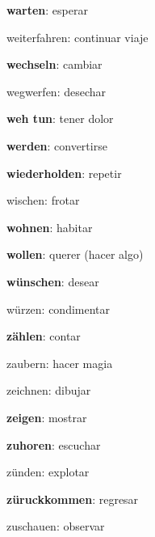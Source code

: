 \begin{multicols}{2}
\begin{myitemize}
\item \textbf{warten}: esperar
\item weiterfahren: continuar viaje
\item \textbf{wechseln}: cambiar
\item wegwerfen: desechar
\item \textbf{weh tun}: tener dolor
\item \textbf{werden}: convertirse
\item \textbf{wiederholden}: repetir
\item wischen: frotar
\item \textbf{wohnen}: habitar
\item \textbf{wollen}: querer (hacer algo)
\item \textbf{wünschen}: desear
\item würzen: condimentar
\item \textbf{zählen}: contar
\item zaubern: hacer magia
\item zeichnen: dibujar
\item \textbf{zeigen}: mostrar
\item \textbf{zuhoren}: escuchar
\item zünden: explotar
\item \textbf{züruckkommen}: regresar
\item zuschauen: observar
\end{myitemize}
\end{multicols}
